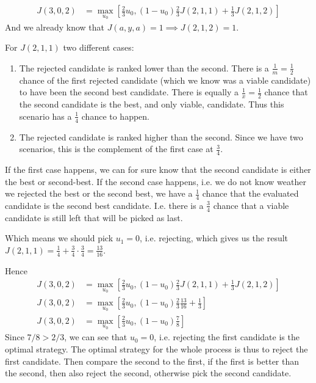\documentclass{article}
\begin{document}
\begin{align}
	J(3,0,2) &= \max_{u_{0}}\left[\frac{2}{3} u_{0}, (1-u_{0}) \frac{2}{3} J(2,1,1) +  \frac{1}{3} J(2,1,2) \right] 
\end{align}
And we already know that $J(a,y,a) = 1 \implies J(2,1,2) = 1$.

For $J(2,1,1)$ two different cases:
\begin{enumerate}
	\item The rejected candidate is ranked lower than the second. There is a $\frac{1}{m} = \frac{1}{2}$ chance of the first rejected candidate (which we know was a viable candidate) to have been the second best candidate. There is equally a $\frac{1}{x} = \frac{1}{2}$ chance that the second candidate is the best, and only viable, candidate. Thus this scenario has a $\frac{1}{4}$ chance to happen. 
	
	\item The rejected candidate is ranked higher than the second. Since we have two scenarios, this is the complement of the first case at $\frac{3}{4}$.
\end{enumerate}
If the first case happens, we can for sure know that the second candidate is either the best or second-best. If the second case happens, i.e. we do not know weather we rejected the best or the second best, we have a $\frac{1}{4}$ chance that the evaluated candidate is the second best candidate. I.e. there is a $\frac{3}{4}$ chance that a viable candidate is still left that will be picked as last.

Which means we should pick $u_1 = 0$, i.e. rejecting, which gives us the result $J(2,1,1) = \frac{1}{4} + \frac{3}{4}\cdot \frac{3}{4} = \frac{13}{16}$.

Hence 
\begin{align}
	J(3,0,2) &= \max_{u_{0}}\left[\frac{2}{3} u_{0}, (1-u_{0}) \frac{2}{3} J(2,1,1) +  \frac{1}{3} J(2,1,2) \right]  \\
	J(3,0,2) &= \max_{u_{0}}\left[\frac{2}{3} u_{0}, (1-u_{0}) \frac{2}{3} \frac{13}{16} + \frac{1}{3}  \right]  \\
	J(3,0,2) &= \max_{u_{0}}\left[\frac{2}{3} u_{0}, (1-u_{0}) \frac{7}{8}  \right] 
\end{align}
Since $7/8>2/3$, we can see that $u_0 = 0$, i.e. rejecting the first candidate is the optimal strategy.
The optimal strategy for the whole process is thus to reject the first candidate. Then compare the second to the first, if the first is better than the second, then also reject the second, otherwise pick the second candidate.
\end{document}
